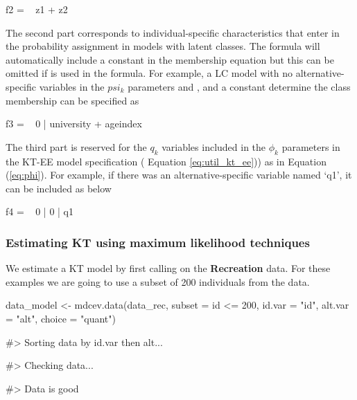 \begin{Schunk}
\begin{Sinput}
f2 = ~ z1 + z2
\end{Sinput}
\end{Schunk}

The second part corresponds to individual-specific characteristics that
enter in the probability assignment in models with latent classes. The
formula will automatically include a constant in the membership equation
but this can be omitted if  is used in the formula. For
example, a LC model with no alternative-specific variables in the
\(psi_k\) parameters and ,  and a
constant determine the class membership can be specified as

\begin{Schunk}
\begin{Sinput}
f3 = ~ 0 | university + ageindex
\end{Sinput}
\end{Schunk}

The third part is reserved for the \(q_k\) variables included in the
\(\phi_k\) parameters in the KT-EE model specification ( Equation
\ref{eq:util_kt_ee})) as in Equation (\ref{eq:phi}). For example, if
there was an alternative-specific variable named `q1', it can be
included as below

\begin{Schunk}
\begin{Sinput}
f4 = ~ 0 | 0 | q1
\end{Sinput}
\end{Schunk}

\hypertarget{estimating-kt-using-maximum-likelihood-techniques}{%
\subsubsection{Estimating KT using maximum likelihood
techniques}\label{estimating-kt-using-maximum-likelihood-techniques}}

We estimate a KT model by first calling  on the
\textbf{Recreation} data. For these examples we are going to use a
subset of 200 individuals from the data.

\begin{Schunk}
\begin{Sinput}
data_model <- mdcev.data(data_rec, subset = id <= 200,
                       id.var = "id",
                       alt.var = "alt",
                       choice = "quant")  
\end{Sinput}
\begin{Soutput}
#> Sorting data by id.var then alt...
\end{Soutput}
\begin{Soutput}
#> Checking data...
\end{Soutput}
\begin{Soutput}
#> Data is good
\end{Soutput}
\end{Schunk}

